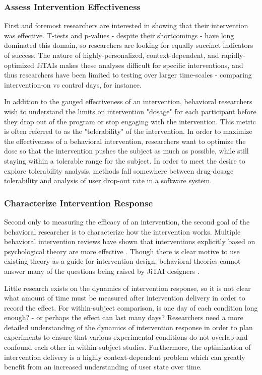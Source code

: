 \subsubsection{Assess Intervention Effectiveness}
First and foremost researchers are interested in showing that their intervention was effective.
T-tests and p-values - despite their shortcomings \cite{nuzzo2014} - have long dominated this domain, so researchers are looking for equally succinct indicators of success.
The nature of highly-personalized, context-dependent, and rapidly-optimized JiTAIs makes these analyses difficult for specific interventions, and thus researchers have been limited to testing over larger time-scales - comparing intervention-on vs control days, for instance.

In addition to the gauged effectiveness of an intervention, behavioral researchers wish to understand the limits on intervention "dosage" for each participant before they drop out of the program or stop engaging with the intervention.
This metric is often referred to as the "tolerability" of the intervention.
In order to maximize the effectiveness of a behavioral intervention, researchers want to optimize the dose so that the intervention pushes the subject as much as possible, while still staying within a tolerable range for the subject.
In order to meet the desire to explore tolerability analysis, methods fall somewhere between drug-dosage tolerability and analysis of user drop-out rate in a software system.


\subsubsection{Characterize Intervention Response}
Second only to measuring the efficacy of an intervention, the second goal of the behavioral researcher is to characterize how the intervention works.
Multiple behavioral intervention reviews have shown that interventions explicitly based on psychological theory are more effective \cite{glanz2010}.
Though there is clear motive to use existing theory as a guide for intervention design, behavioral theories cannot answer many of the questions being raised by JiTAI designers \cite{riley2011}.

Little research exists on the dynamics of intervention response, so it is not clear what amount of time must be measured after intervention delivery in order to record the effect.
For within-subject comparison, is one day of each condition long enough? - or perhaps the effect can last many days?
Researchers need a more detailed understanding of the dynamics of intervention response in order to plan experiments to ensure that various experimental conditions do not overlap and confound each other in within-subject studies.
Furthermore, the optimization of intervention delivery is a highly context-dependent problem which can greatly benefit from an increased understanding of user state over time.


